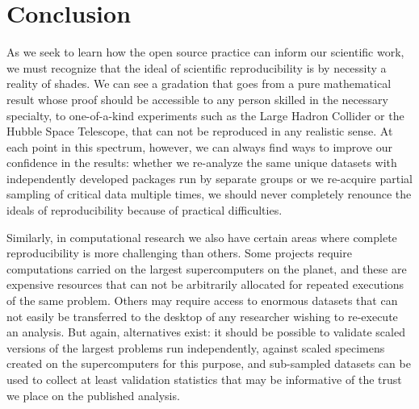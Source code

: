 \documentclass[ChapterTOCs,krantz2]{krantz} %
\begin{document}
\section{Conclusion}\label{conclusion}


As we seek to learn how the open source practice can inform our scientific
work, we must recognize that the ideal of scientific reproducibility
is by necessity a reality of shades. We can see a gradation that goes
from a pure mathematical result whose proof should be accessible to
any person skilled in the necessary specialty, to one-of-a-kind experiments
such as the Large Hadron Collider or the Hubble Space Telescope, that
can not be reproduced in any realistic sense. At each point in this
spectrum, however, we can always find ways to improve our confidence
in the results: whether we re-analyze the same unique datasets with
independently developed packages run by separate groups or we re-acquire
partial sampling of critical data multiple times, we should never
completely renounce the ideals of reproducibility because of practical
difficulties.

Similarly, in computational research we also have certain areas where
complete reproducibility is more challenging than others. Some projects
require computations carried on the largest supercomputers on the
planet, and these are expensive resources that can not be arbitrarily
allocated for repeated executions of the same problem. Others may
require access to enormous datasets that can not easily be transferred
to the desktop of any researcher wishing to re-execute an analysis.
But again, alternatives exist: it should be possible to validate scaled
versions of the largest problems run independently, against scaled
specimens created on the supercomputers for this purpose, and
sub-sampled datasets can be used to collect at least validation statistics
that may be informative of the trust we place on the published analysis.

%
\end{document}
